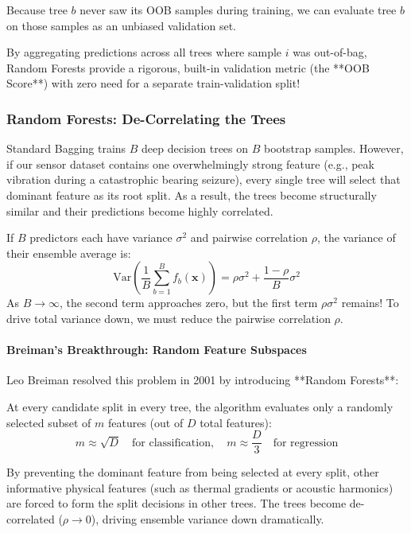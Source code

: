 \begin{keyidea}
Because tree $b$ never saw its OOB samples during training, we can evaluate tree $b$ on those samples as an unbiased validation set. 

By aggregating predictions across all trees where sample $i$ was out-of-bag, Random Forests provide a rigorous, built-in validation metric (the **OOB Score**) with zero need for a separate train-validation split!
\end{keyidea}

\subsubsection{Random Forests: De-Correlating the Trees}
Standard Bagging trains $B$ deep decision trees on $B$ bootstrap samples. However, if our sensor dataset contains one overwhelmingly strong feature (e.g., peak vibration during a catastrophic bearing seizure), every single tree will select that dominant feature as its root split. As a result, the trees become structurally similar and their predictions become highly correlated.

If $B$ predictors each have variance $\sigma^2$ and pairwise correlation $\rho$, the variance of their ensemble average is:
\begin{equation}
\text{Var}\left( \frac{1}{B} \sum_{b=1}^{B} f_b(\mathbf{x}) \right) = \rho \sigma^2 + \frac{1 - \rho}{B} \sigma^2\label{eq:rf_variance_formula}
\end{equation}
As $B \to \infty$, the second term approaches zero, but the first term $\rho \sigma^2$ remains! To drive total variance down, we must reduce the pairwise correlation $\rho$.

\paragraph{Breiman's Breakthrough: Random Feature Subspaces}
Leo Breiman resolved this problem in 2001 by introducing **Random Forests**:
\begin{keyidea}
At every candidate split in every tree, the algorithm evaluates only a randomly selected subset of $m$ features (out of $D$ total features):
\begin{equation}
m \approx \sqrt{D} \quad \text{for classification}, \quad m \approx \frac{D}{3} \quad \text{for regression}\label{eq:random_forest_m_features}
\end{equation}
\end{keyidea}
By preventing the dominant feature from being selected at every split, other informative physical features (such as thermal gradients or acoustic harmonics) are forced to form the split decisions in other trees. The trees become de-correlated ($\rho \to 0$), driving ensemble variance down dramatically.


